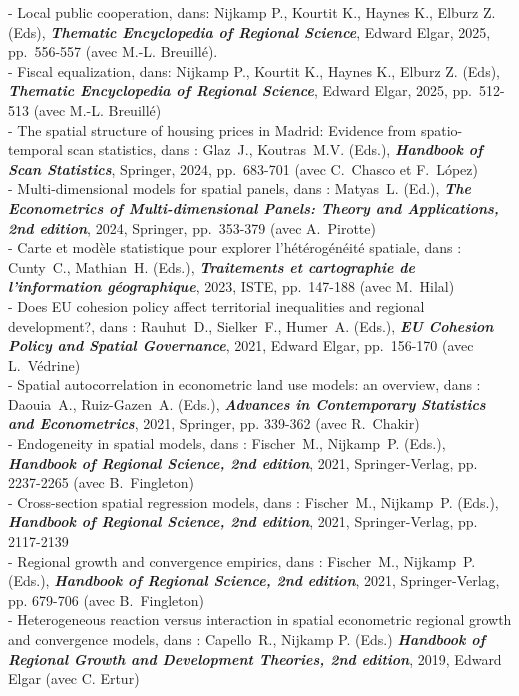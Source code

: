 \documentclass[a4paper,12pt]{article}
\begin{document}
\noindent - Local public cooperation, dans: Nijkamp P., Kourtit K., Haynes K., Elburz Z. (Eds), \textit{\textbf{Thematic Encyclopedia of Regional Science}}, Edward Elgar, 2025, pp.~556-557 (avec M.-L. Breuillé). \\
- Fiscal equalization, dans: Nijkamp P., Kourtit K., Haynes K., Elburz Z. (Eds), \textit{\textbf{Thematic Encyclopedia of Regional Science}},  Edward Elgar, 2025, pp.~512-513 (avec M.-L. Breuillé) \\
- The spatial structure of housing prices in Madrid: Evidence from spatio-temporal scan statistics, dans : Glaz~J., Koutras~M.V. (Eds.), \textit{\textbf{Handbook of Scan Statistics}}, Springer, 2024, pp.~683-701 (avec C.~Chasco et F.~López) \\
- Multi-dimensional models for spatial panels, dans : Matyas~L. (Ed.), \textit{\textbf{The Econometrics of Multi-dimensional Panels: Theory and Applications, 2nd edition}}, 2024, Springer, pp.~353-379 (avec A.~Pirotte) \\
- Carte et modèle statistique pour explorer l'hétérogénéité spatiale, dans : Cunty~C., Mathian~H. (Eds.), \textit{\textbf{Traitements et cartographie de l'information géographique}}, 2023, ISTE, pp.~147-188 (avec M.~Hilal) \\
- Does EU cohesion policy affect territorial inequalities and regional development?, dans : Rauhut~D., Sielker~F., Humer~A. (Eds.), \textit{\textbf{EU Cohesion Policy and Spatial Governance}}, 2021, Edward Elgar, pp.~156-170  (avec L.~Védrine) \\
- Spatial autocorrelation in econometric land use models: an overview, dans : Daouia~A., Ruiz-Gazen~A. (Eds.), \textit{\textbf{Advances in Contemporary Statistics and Econometrics}}, 2021, Springer, pp. 339-362 (avec R.~Chakir) \\
- Endogeneity in spatial models, dans : Fischer~M., Nijkamp~P. (Eds.), \textit{\textbf{Handbook of Regional Science, 2nd edition}}, 2021, Springer-Verlag, pp. 2237-2265  (avec B.~Fingleton) \\
- Cross-section spatial regression models, dans : Fischer~M., Nijkamp~P. (Eds.), \textit{\textbf{Handbook of Regional Science, 2nd edition}}, 2021, Springer-Verlag, pp. 2117-2139  \\
- Regional growth and convergence empirics, dans : Fischer~M., Nijkamp~P. (Eds.), \textit{\textbf{Handbook of Regional Science, 2nd edition}}, 2021, Springer-Verlag, pp. 679-706 (avec B.~Fingleton) \\
- Heterogeneous reaction versus interaction in spatial econometric regional growth and convergence models, dans : Capello~R., Nijkamp P. (Eds.) \textit{\textbf{Handbook of Regional Growth and Development Theories, 2nd edition}}, 2019, Edward Elgar (avec C. Ertur) \\
\end{document}
